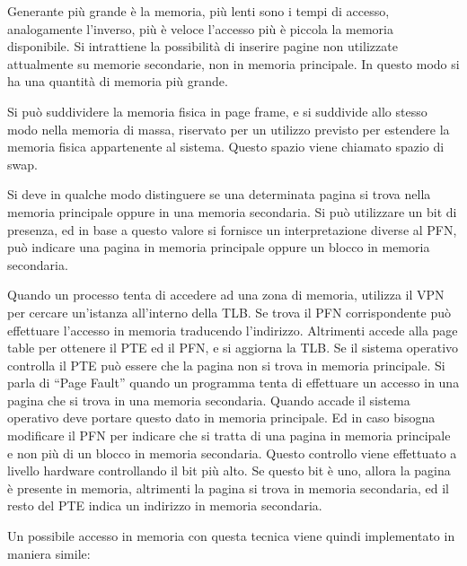 \documentclass{article}
\numberwithin{equation}{subsection}
\begin{document}

Generante più grande è la memoria, più lenti sono i tempi di accesso, analogamente l'inverso, più è veloce l'accesso più è piccola la memoria disponibile. Si intrattiene 
la possibilità di inserire pagine non utilizzate attualmente su memorie secondarie, non in memoria principale. In questo modo si ha una quantità di memoria più grande. 

Si può suddividere la memoria fisica in page frame, e si suddivide allo stesso modo nella memoria di massa, riservato per un utilizzo previsto per estendere la memoria 
fisica appartenente al sistema. Questo spazio viene chiamato spazio di swap. 


Si deve in qualche modo distinguere se una determinata pagina si trova nella memoria principale oppure in una memoria secondaria. Si può utilizzare un bit di 
presenza, ed in base a questo valore si fornisce un interpretazione diverse al PFN, può indicare una pagina in memoria principale oppure un blocco in memoria secondaria. 

Quando un processo tenta di accedere ad una zona di memoria, utilizza il VPN per cercare un'istanza all'interno della TLB. Se trova il PFN corrispondente può effettuare l'accesso 
in memoria traducendo l'indirizzo. Altrimenti accede alla page table per ottenere il PTE ed il PFN, e si aggiorna la TLB. 
Se il sistema operativo controlla il PTE può essere che la pagina non si trova in memoria principale. 
Si parla di ``Page Fault'' quando un programma tenta di effettuare un accesso in una pagina che si trova in una memoria secondaria. Quando accade il sistema operativo 
deve portare questo dato in memoria principale. Ed in caso bisogna modificare il PFN per indicare che si tratta di una pagina in memoria principale e non più di un blocco 
in memoria secondaria. Questo controllo viene effettuato a livello hardware controllando il bit più alto. Se questo bit è uno, allora la pagina è presente in memoria, 
altrimenti la pagina si trova in memoria secondaria, ed il resto del PTE indica un indirizzo in memoria secondaria. 

Un possibile accesso in memoria con questa tecnica viene quindi implementato in maniera simile:
\end{document}
